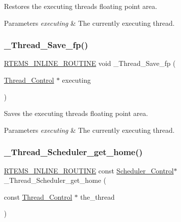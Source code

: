 Restores the executing thread\textquotesingle{}s floating point area. 


\begin{DoxyParams}{Parameters}
{\em executing} & The currently executing thread. \\
\hline
\end{DoxyParams}
\mbox{\label{group__RTEMSScoreThread_gaa10e7acfe1b219ad258d5342bca2bc63}} 
\subsubsection{\texorpdfstring{\_Thread\_Save\_fp()}{\_Thread\_Save\_fp()}}
{\footnotesize\ttfamily \mbox{\hyperlink{group__RTEMSScoreBaseDefs_gac216239df231d5dbd15e3520b0b9313f}{R\+T\+E\+M\+S\+\_\+\+I\+N\+L\+I\+N\+E\+\_\+\+R\+O\+U\+T\+I\+NE}} void \+\_\+\+Thread\+\_\+\+Save\+\_\+fp (\begin{DoxyParamCaption}\item[{\mbox{\hyperlink{struct__Thread__Control}{Thread\+\_\+\+Control}} $\ast$}]{executing }\end{DoxyParamCaption})}



Saves the executing thread\textquotesingle{}s floating point area. 


\begin{DoxyParams}{Parameters}
{\em executing} & The currently executing thread. \\
\hline
\end{DoxyParams}
\mbox{\label{group__RTEMSScoreThread_ga740b780440af6ea6cf7a3c13373629e3}} 
\subsubsection{\texorpdfstring{\_Thread\_Scheduler\_get\_home()}{\_Thread\_Scheduler\_get\_home()}}
{\footnotesize\ttfamily \mbox{\hyperlink{group__RTEMSScoreBaseDefs_gac216239df231d5dbd15e3520b0b9313f}{R\+T\+E\+M\+S\+\_\+\+I\+N\+L\+I\+N\+E\+\_\+\+R\+O\+U\+T\+I\+NE}} const \mbox{\hyperlink{struct__Scheduler__Control}{Scheduler\+\_\+\+Control}}$\ast$ \+\_\+\+Thread\+\_\+\+Scheduler\+\_\+get\+\_\+home (\begin{DoxyParamCaption}\item[{const \mbox{\hyperlink{struct__Thread__Control}{Thread\+\_\+\+Control}} $\ast$}]{the\+\_\+thread }\end{DoxyParamCaption})}




